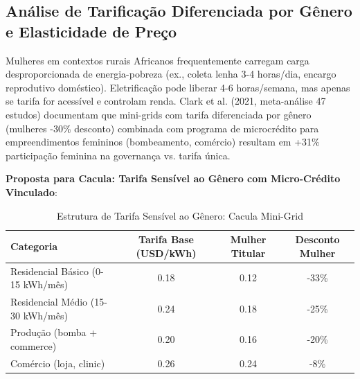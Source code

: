 \documentclass[12pt, a4paper]{article}
\begin{document}
\subsection{Análise de Tarificação Diferenciada por Gênero e Elasticidade de Preço}

Mulheres em contextos rurais Africanos frequentemente carregam carga desproporcionada de energia-pobreza (ex., coleta lenha 3-4 horas/dia, encargo reprodutivo doméstico). Eletrificação pode liberar 4-6 horas/semana, mas apenas se tarifa for acessível e controlam renda. Clark et al. (2021, meta-análise 47 estudos) documentam que mini-grids com tarifa diferenciada por gênero (mulheres -30\% desconto) combinada com programa de microcrédito para empreendimentos femininos (bombeamento, comércio) resultam em +31\% participação feminina na governança vs. tarifa única.

\textbf{Proposta para Cacula: Tarifa Sensível ao Gênero com Micro-Crédito Vinculado}:

\begin{table}[H]
\centering
\caption{Estrutura de Tarifa Sensível ao Gênero: Cacula Mini-Grid}
\label{tab:gender_tariff}
\small
\begin{tabular}{|l|c|c|c|}
\hline
\textbf{Categoria} & \textbf{Tarifa Base (USD/kWh)} & \textbf{Mulher Titular} & \textbf{Desconto Mulher} \\
\hline
Residencial Básico (0-15 kWh/mês) & 0.18 & 0.12 & -33\% \\
Residencial Médio (15-30 kWh/mês) & 0.24 & 0.18 & -25\% \\
Produção (bomba + commerce) & 0.20 & 0.16 & -20\% \\
Comércio (loja, clinic) & 0.26 & 0.24 & -8\% \\
\hline
\end{tabular}
\end{table}
\end{document}

